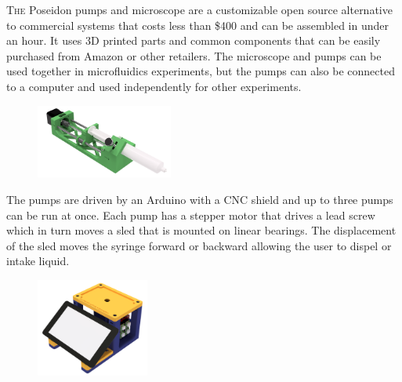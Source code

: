 \documentclass[10pt]{article} %
\begin{document}
	\begin{minipage}[t]{.66\linewidth} %
		
		\hypertarget{firstnews}{} %
		\lettrine[lraise=0.1, nindent=0em, slope=-.5em]{T}{he} Poseidon pumps and microscope are a customizable open source alternative to commercial systems that costs less than \$400 and can be assembled in under an hour. It uses 3D printed parts and common components that can be easily purchased from Amazon or other retailers. The microscope and pumps can be used together in microfluidics experiments, but the pumps can also be connected to a computer and used independently for other experiments.
		

		
		
		\begin{figure} %
			\includegraphics[width=0.4\textwidth]{img/pump-ortho.png}
		\end{figure}
		The pumps are driven by an Arduino with a CNC shield and up to three pumps can be run at once. Each pump has a stepper motor that drives a lead screw which in turn moves a sled that is mounted on linear bearings. The displacement of the sled moves the syringe forward or backward allowing the user to dispel or intake liquid.


		\begin{figure} %
			\includegraphics[width=0.33\textwidth]{img/cam-ortho.png}
		\end{figure}
		

\end{minipage}
\end{document}
